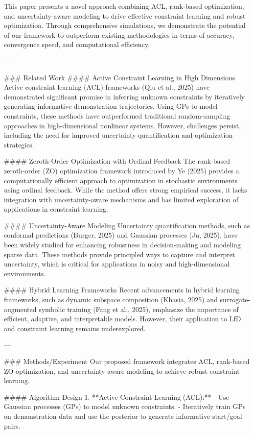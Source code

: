 This paper presents a novel approach combining ACL, rank-based optimization, and uncertainty-aware modeling to drive effective constraint learning and robust optimization. Through comprehensive simulations, we demonstrate the potential of our framework to outperform existing methodologies in terms of accuracy, convergence speed, and computational efficiency.  

---

### Related Work  
#### Active Constraint Learning in High Dimensions  
Active constraint learning (ACL) frameworks (Qiu et al., 2025) have demonstrated significant promise in inferring unknown constraints by iteratively generating informative demonstration trajectories. Using GPs to model constraints, these methods have outperformed traditional random-sampling approaches in high-dimensional nonlinear systems. However, challenges persist, including the need for improved uncertainty quantification and optimization strategies.  

#### Zeroth-Order Optimization with Ordinal Feedback  
The rank-based zeroth-order (ZO) optimization framework introduced by Ye (2025) provides a computationally efficient approach to optimization in stochastic environments using ordinal feedback. While the method offers strong empirical success, it lacks integration with uncertainty-aware mechanisms and has limited exploration of applications in constraint learning.  

#### Uncertainty-Aware Modeling  
Uncertainty quantification methods, such as conformal predictions (Burger, 2025) and Gaussian processes (Ju, 2025), have been widely studied for enhancing robustness in decision-making and modeling sparse data. These methods provide principled ways to capture and interpret uncertainty, which is critical for applications in noisy and high-dimensional environments.  

#### Hybrid Learning Frameworks  
Recent advancements in hybrid learning frameworks, such as dynamic subspace composition (Khasia, 2025) and surrogate-augmented symbolic training (Fang et al., 2025), emphasize the importance of efficient, adaptive, and interpretable models. However, their application to LfD and constraint learning remains underexplored.  

---

### Methods/Experiment  
Our proposed framework integrates ACL, rank-based ZO optimization, and uncertainty-aware modeling to achieve robust constraint learning.  

#### Algorithm Design  
1. **Active Constraint Learning (ACL):**  
   - Use Gaussian processes (GPs) to model unknown constraints.  
   - Iteratively train GPs on demonstration data and use the posterior to generate informative start/goal pairs.  


